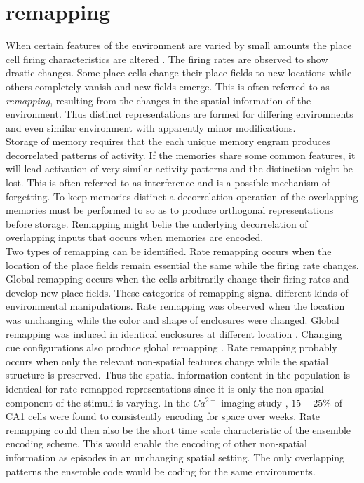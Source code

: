 \section{remapping}
\label{remapping}
When certain features of the environment are varied by small amounts the place cell firing characteristics are altered \cite{Kubie1987}. The firing rates are observed to show drastic changes. Some place cells change their place fields to new locations while others completely vanish and new fields emerge. This is often referred to as \emph{remapping}, resulting from the changes in the spatial information of the environment. Thus distinct representations are formed for differing environments and even similar environment with apparently minor modifications. \\
Storage of memory requires that the each unique memory engram produces decorrelated patterns of activity. If the memories share some common features, it will lead activation of very similar activity patterns and the distinction might be lost. This is often referred to as interference and is a possible mechanism of forgetting. To keep memories distinct a decorrelation operation of the overlapping memories must be performed to so as to produce orthogonal representations before storage. Remapping might belie the underlying decorrelation of overlapping inputs that occurs when memories are encoded. \\
Two types of remapping can be identified. Rate remapping occurs when the location of the place fields remain essential the same while the firing rate changes. Global remapping occurs when the cells arbitrarily change their firing rates and develop new place fields. These categories of remapping signal different kinds of environmental manipulations. Rate remapping was observed when the location was unchanging while the color and shape of enclosures were changed. Global remapping was induced in identical enclosures at different location \cite{Leutgeb2005a}. Changing cue configurations also produce global remapping \cite{Leutgeb2005a}.
Rate remapping probably occurs when only the relevant non-spatial features change while the spatial structure is preserved. Thus the spatial information content in the population is identical for rate remapped representations since it is only the non-spatial component of the stimuli is varying. In the $Ca^{2+}$ imaging study \cite{Ziv2013}, $15-25 \% $ of CA1 cells were found to consistently encoding for space over weeks. Rate remapping could then also be the short time scale characteristic of the ensemble encoding scheme. This would enable the encoding of other non-spatial information as episodes in an unchanging spatial setting. The only overlapping patterns the ensemble code would be coding for the same environments. \\
